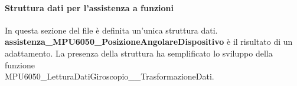 \documentclass[11pt]{report}
\begin{document}
\paragraph{Struttura dati per l'assistenza a funzioni}
In questa sezione del file è definita un'unica struttura dati.\\
\textbf{assistenza\_MPU6050\_PosizioneAngolareDispositivo} è il risultato di un adattamento. La presenza della struttura ha semplificato lo sviluppo della funzione\\
MPU6050\_LetturaDatiGiroscopio\_\_TrasformazioneDati.

\end{document}
